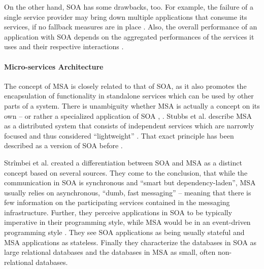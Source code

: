     On the other hand, \ac{SOA} has some drawbacks, too.
    For example, the failure of a single service provider may bring down multiple applications that consume its services, if no fallback measures are in place \cite[p.~408f]{Papazoglou2007Service}.
    Also, the overall performance of an application with \ac{SOA} depends on the aggregated performances of the services it uses and their respective interactions \cite[p.~408f]{Papazoglou2007Service}.


  \paragraph{Micro-services Architecture} %
    \label{par:micro_services_architecture}
    The concept of \ac{MSA} is closely related to that of \ac{SOA}, as it also promotes the encapsulation of functionality in standalone services which can be used by other parts of a system. There is unambiguity whether \ac{MSA} is actually a concept on its own -- or rather a specialized application of \ac{SOA} \cite[p.~35]{Stubbs2015Distributed}, \cite[p.~17]{Strimbei2015Software}.
    Stubbs et al. describe \ac{MSA} as a distributed system that consists of independent services which are   narrowly focused and thus considered ``lightweight'' \cite[p.~35]{Stubbs2015Distributed}.
    That exact principle has been described as a version of \ac{SOA} before \cite[p.~395]{Papazoglou2007Service}.

    Strîmbei et al. created a differentiation between SOA and MSA as a distinct concept based on several sources. They come to the conclusion, that while the communication in \ac{SOA} is synchronous and ``smart but dependency-laden'', \ac{MSA} usually relies on asynchronous, ``dumb, fast messaging'' -- meaning that there is few information on the participating services contained in the messaging infrastructure. Further, they perceive applications in \ac{SOA} to be typically imperative in their programming style, while \ac{MSA} would be in an event-driven programming style \cite[pp.~17-20]{Strimbei2015Software}. They see \ac{SOA} applications as being usually stateful and \ac{MSA} applications as stateless. Finally they characterize the databases in \ac{SOA} as large relational databases and the databases in \ac{MSA} as small, often non-relational databases.

